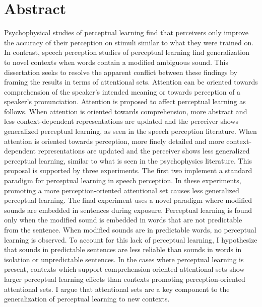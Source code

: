 
\chapter{Abstract}

Psychophysical studies of perceptual learning find that perceivers only improve the accuracy of their perception on stimuli similar to what they were trained on.
In contrast, speech perception studies of perceptual learning find generalization to novel contexts when words contain a modified ambiguous sound.
This dissertation seeks to resolve the apparent conflict between these findings by framing the results in terms of attentional sets.
Attention can be oriented towards comprehension of the speaker's intended meaning or towards perception of a speaker's pronunciation.
Attention is proposed to affect perceptual learning as follows.
When attention is oriented towards comprehension, more abstract and less context-dependent representations are updated and the perceiver shows generalized perceptual learning, as seen in the speech perception literature.
When attention is oriented towards perception, more finely detailed and more context-dependent representations are updated and the perceiver shows less generalized perceptual learning, similar to what is seen in the psychophysics literature.
This proposal is supported by three experiments.
The first two implement a standard paradigm for perceptual learning in speech perception.
In these experiments, promoting a more perception-oriented attentional set causes less generalized perceptual learning.
The final experiment uses a novel paradigm where modified sounds are embedded in sentences during exposure.
Perceptual learning is found only when the modified sound is embedded in words that are not predictable from the sentence.
When modified sounds are in predictable words, no perceptual learning is observed.
To account for this lack of perceptual learning, I hypothesize that sounds in predictable sentences are less reliable than sounds in words in isolation or unpredictable sentences.
In the cases where perceptual learning is present, contexts which support comprehension-oriented attentional sets show larger perceptual learning effects than contexts promoting perception-oriented attentional sets.
I argue that attentional sets are a key component to the generalization of perceptual learning to new contexts.


